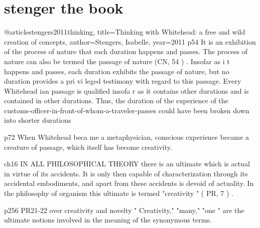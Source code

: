 \section{stenger the book}
@article{stengers2011thinking,
	title={Thinking with Whitehead: a free and wild creation of concepts},
	author={Stengers, Isabelle},
	year={2011}
	}
p54
It is an exhibition of the process of nature that each duration happens
and passes. The process of nature can also be termed the passage of nature
(CN, 54 ) .
Insofar as i t happens and passes, each duration exhibits the passage of
nature, but no duration provides a pri vi leged testimony with regard to
this passage. Every Whitehead ian passage is qualified insofa r as it contains
other durations and is contained in other durations. Thus, the duration of
the experience of the customs-officer-in-front-of-whom-a-traveler-passes
could have been broken down into shorter durations

p72
When Whitehead beca me a metaphysician,
conscious experience became a creature of passage, which itself has
become creativity.

ch16
IN ALL PHILOSOPHICAL THEORY there is an ultimate which is actual
in virtue of its accidents. It is only then capable of characterization
through its accidental embodiments, and apart from these
accidents is devoid of actuality. In the philosophy of organism this ultimate
is termed "creativity " ( PR, 7 ) .

p256 PR21-22 over creativity and novelty
" Creativity," "many," "one " are the ultimate notions involved in the
meaning of the synonymous terms.

%


